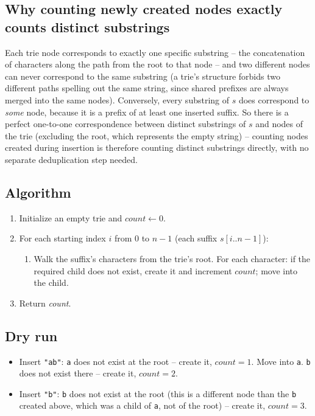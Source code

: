 \subsection*{Why counting newly created nodes exactly counts distinct substrings}

Each trie node corresponds to exactly one specific substring -- the
concatenation of characters along the path from the root to that node --
and two different nodes can never correspond to the same substring (a
trie's structure forbids two different paths spelling out the same
string, since shared prefixes are always merged into the same nodes).
Conversely, every substring of $s$ does correspond to \emph{some} node,
because it is a prefix of at least one inserted suffix. So there is a
perfect one-to-one correspondence between distinct substrings of $s$ and
nodes of the trie (excluding the root, which represents the empty
string) -- counting nodes created during insertion is therefore counting
distinct substrings directly, with no separate deduplication step needed.

\subsection*{Algorithm}

\begin{enumerate}
  \item Initialize an empty trie and $\textit{count} \gets 0$.
  \item For each starting index $i$ from $0$ to $n-1$ (each suffix
        $s[i..n-1]$):
  \begin{enumerate}
    \item Walk the suffix's characters from the trie's root. For each
          character: if the required child does not exist, create it
          and increment $\textit{count}$; move into the child.
  \end{enumerate}
  \item Return \textit{count}.
\end{enumerate}

\subsection*{Dry run}


\begin{itemize}
  \item Insert \texttt{"ab"}: \texttt{a} does not exist at the root --
        create it, $\textit{count}=1$. Move into \texttt{a}.
        \texttt{b} does not exist there -- create it, $\textit{count}=2$.
  \item Insert \texttt{"b"}: \texttt{b} does not exist at the root
        (this is a different node than the \texttt{b} created above,
        which was a child of \texttt{a}, not of the root) -- create it,
        $\textit{count}=3$.
\end{itemize}

